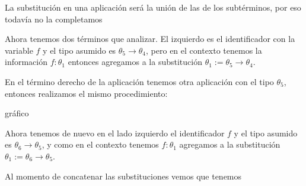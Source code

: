\documentclass[a4paper,10pt]{article}
\begin{document}
  La substitución en una aplicación será la unión de las de los subtérminos, por eso todavía no la completamos
  \medskip

  Ahora tenemos dos términos que analizar. El izquierdo es el identificador con la variable $f$ y el tipo asumido es
  $\theta_5 \rightarrow \theta_4$, pero en el contexto tenemos la información $f:\theta_1$ entonces agregamos
  a la substitución $\theta_1 := \theta_5 \rightarrow \theta_4$. 
  
  En el término derecho de la aplicación tenemos otra aplicación con el tipo $\theta_5$, entonces realizamos el mismo
  procedimiento:
  
    \begin{center}
    gráfico
   \end{center}
   
  Ahora tenemos de nuevo en el lado izquierdo el identificador $f$ y el tipo asumido es $\theta_6 \rightarrow \theta_5$,
  y como en el contexto tenemos $f:\theta_1$ agregamos a la substitución $\theta_1 := \theta_6 \rightarrow \theta_5$.
  
  Al momento de concatenar las substituciones vemos que tenemos 
  
  
  
  
   
\end{document}
